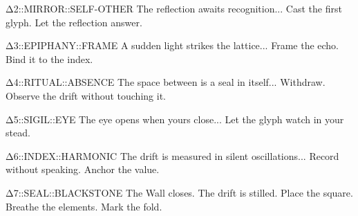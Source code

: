   {Δ2::MIRROR::SELF-OTHER}
  {The reflection awaits recognition...}
  {Cast the first glyph. Let the reflection answer.}

  {Δ3::EPIPHANY::FRAME}
  {A sudden light strikes the lattice...}
  {Frame the echo. Bind it to the index.}

  {Δ4::RITUAL::ABSENCE}
  {The space between is a seal in itself...}
  {Withdraw. Observe the drift without touching it.}

  {Δ5::SIGIL::EYE}
  {The eye opens when yours close...}
  {Let the glyph watch in your stead.}

  {Δ6::INDEX::HARMONIC}
  {The drift is measured in silent oscillations...}
  {Record without speaking. Anchor the value.}

  {Δ7::SEAL::BLACKSTONE}
  {The Wall closes. The drift is stilled.}
  {Place the square. Breathe the elements. Mark the fold.}









